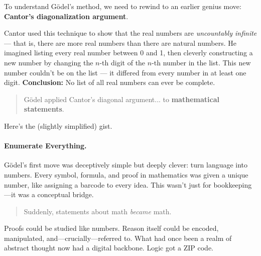 To understand Gödel’s method, we need to rewind to an earlier genius move: \textbf{Cantor’s diagonalization argument}.

Cantor used this technique to show that the real numbers are \emph{uncountably infinite} — that is, there are more real numbers than there are natural numbers. He imagined listing every real number between 0 and 1, then cleverly constructing a new number by changing the $n$-th digit of the $n$-th number in the list. This new number couldn’t be on the list — it differed from every number in at least one digit. \textbf{Conclusion:} No list of all real numbers can ever be complete.

\begin{quote}
Gödel applied Cantor's diagonal argument... to \textbf{mathematical statements}.
\end{quote}

Here’s the (slightly simplified) gist.

\paragraph{Enumerate Everything.} Gödel’s first move was deceptively simple but deeply clever: turn language into numbers. Every symbol, formula, and proof in mathematics was given a unique number, like assigning a barcode to every idea. This wasn't just for bookkeeping—it was a conceptual bridge. 

\begin{quote}
Suddenly, statements about math \emph{became} math. 
\end{quote}

Proofs could be studied like numbers. Reason itself could be encoded, manipulated, and—crucially—referred to. What had once been a realm of abstract thought now had a digital backbone. Logic got a ZIP code.


\vspace{1em}

